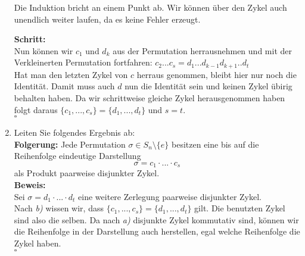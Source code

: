 \documentclass[11pt,a4paper,ngerman]{article}
\begin{document}
\begin{enumerate}[\bfseries a)]

Die Induktion bricht an einem Punkt ab. Wir können über den Zykel auch unendlich weiter laufen, da es keine Fehler erzeugt.\\
\pagebreak

\textbf{Schritt:}\\
Nun können wir $c_1$ und $d_k$ aus der Permutation herrausnehmen und mit der Verkleinerten Permutation fortfahren:
$c_2 ... c_s = d_1 ... d_{k-1} d_{k+1} .. d_t$\\

Hat man den letzten Zykel von $c$ herraus genommen, bleibt hier nur noch die Identität. Damit muss auch $d$ nun die Identität sein und keinen Zykel übirig behalten haben. Da wir schrittweise gleiche Zykel herausgenommen haben folgt daraus $\{ c_1 , ... , c_s \} = \{ d_1 , ... , d_t \}$ und $s = t$. \\
\mbox{} \hfill $\square$

\item Leiten Sie folgendes Ergebnis ab: \\
\textbf{Folgerung:} Jede Permutation $\sigma \in S_n \setminus \{ e \}$ besitzen eine bis auf die Reihenfolge eindeutige Darstellung
$$
\sigma = c_1 \cdot ... \cdot c_s
$$
als Produkt paarweise disjunkter Zykel.\\

\textbf{Beweis:}\\
Sei $\sigma = d_1 \cdot ... \cdot d_t$ eine weitere Zerlegung paarweise disjunkter Zykel.\\

Nach \emph{b)} wissen wir, dass $\{c_1 , ..., c_s \} = \{ d_1 , ... , d_t \}$ gilt. Die benutzten Zykel sind also die selben. Da nach \emph{a)} disjunkte Zykel kommutativ sind, können wir die Reihenfolge in der Darstellung auch herstellen, egal welche Reihenfolge die Zykel haben.\\
\mbox{} \hfill $\square$

\end{enumerate}
\end{document}
